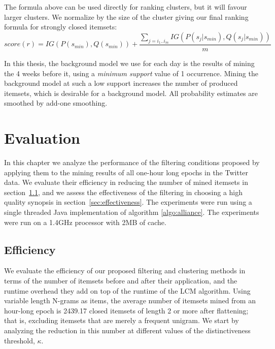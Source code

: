\documentclass[letterpaper,12pt,titlepage,oneside,final]{book}
\begin{document}
The formula above can be used directly for ranking clusters,
but it will favour larger clusters.
We normalize by the size of the cluster giving our final ranking formula for
strongly closed itemsets:
\begin{equation}\label{eq:avgIG}score(r) = IG(P(s_{min}), Q(s_{min})) + \frac{ \sum_{ j = i_1..i_m } { IG(P(s_j|s_{min}), Q(s_j|s_{min})) } } { m } \end{equation}

In this thesis, the background model we use for each day is the results of mining the 4 weeks
before it, using a \emph{minimum support} value of 1 occurrence.
Mining the background model at such a low support increases the number of
produced itemsets, which is desirable for a background model.
All probability estimates are smoothed by add-one smoothing. 




\chapter{Evaluation}
\label{sec:empirical}

In this chapter we analyze the performance of the filtering conditions proposed by applying
them to the mining results of all one-hour long epochs in the Twitter data.
We evaluate their efficiency in reducing the number of mined itemsets in section~\ref{sec:effic},
and we assess the effectiveness of the filtering in choosing a high quality synopsis in section~\ref{sec:effectiveness}.
The experiments were run using a single threaded Java implementation of
algorithm \ref{algo:alliance}. %
The experiments were run on a 1.4GHz processor with 2MB of cache.


\section{Efficiency}
\label{sec:effic}

We evaluate the efficiency of our proposed filtering and clustering methods 
in terms of the number of itemsets before and after their application,
and the runtime overhead they add on top of the runtime of the LCM algorithm.
Using variable length N-grams as items, 
the average number of itemsets mined from an hour-long epoch is
2439.17 closed itemsets of length 2 or more after flattening;
that is, excluding itemsets that are merely a frequent unigram.
We start by analyzing the reduction in this number at different values
of the distinctiveness threshold, $\kappa$.
\end{document}
